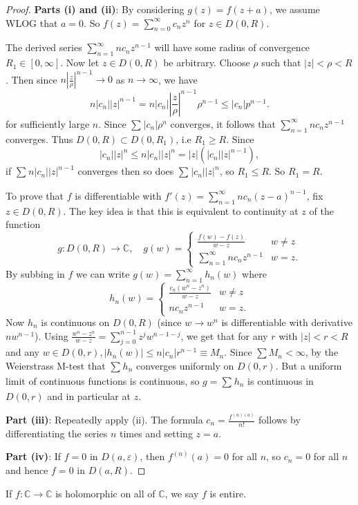 \documentclass[egregdoesnotlikesansseriftitles,a4paper]{scrartcl}
\begin{document}
\begin{proof}
      \textbf{Parts (i) and (ii)}: By considering $g (z)=f (z+a)$, we assume WLOG that $a=0$. So $f (z)=\sum_{n=0}^{ \infty}c_{n}z^{n}$ for $z \in D (0,R)$. 

     The derived series $\sum_{n=1}^{ \infty}nc_{n}z^{n-1}$ will have some radius of convergence $R_1 \in [0, \infty]$. Now let $z \in D (0,R)$ be arbitrary. Choose $\rho$ such that $|z|<\rho<R$. Then since $n |\frac{z}{\rho}|^{n-1} \rightarrow 0 $ as $n \rightarrow \infty$, we have \[
     n |c_n||z|^{n-1}=n |c_n||\frac{z}{\rho}|^{n-1}\rho^{n-1} \leq |c_n|p^{n-1}
     .\]  
     for sufficiently large $n$. Since $\sum_{}^{}|c_{n}|\rho^{n}$ converges, it follows that $\sum_{n=1}^{ \infty}nc_{n}z^{n-1}$ converges. Thus $D (0,R)\subset D (0,R_1 )$, i.e $R_1 \geq R$. Since \[
     |c_{n}||z|^{n} \leq n|c_{n}||z|^{n}=|z|\left(|c_{n}||z|^{n-1}\right)
     ,\] 
     if $\sum_{}^{}n |c_{n}||z|^{n-1}$ converges then so does $\sum_{}^{}|c_{n}||z|^{n}$, so $R_1 \leq R$. So $R_1 =R$. 
     
     To prove that $f$ is differentiable with $f' (z)=\sum_{n=1}^{ \infty}nc_{n}(z-a)^{n-1}$, fix $z \in D (0,R)$. The key idea is that this is equivalent to continuity at $z$ of the function 
     \begin{equation*}
          g: D (0,R) \rightarrow \mathbb{C}, \quad g (w)=
           \begin{cases}
                \frac{f (w)- f (z)}{w-z} & w \neq z\\
                \sum_{n=1}^{ \infty}nc_{n}z^{n-1} & w=z.
           \end{cases}          
     \end{equation*}
     By subbing in $f$ we can write $g (w)=\sum_{n=1}^{ \infty}h_{n}(w)$ where 
     \begin{equation*}
          h_{n} (w)=
          \begin{cases}
               \frac{c_{n}(w^{n}-z^{n})}{w-z} & w \neq z\\
               nc_{n}z^{n-1} & w=z.
          \end{cases}  
     \end{equation*}
     Now $h_{n}$ is continuous on $D (0,R)$ (since $w \rightarrow w^{n}$ is differentiable with derivative $nw^{n-1}$). Using $ \frac{w^{n}-z^{n}}{w-z}=\sum_{j=0}^{n-1}z^{j}w^{n-1-j}$, we get that for any $r$ with $|z|<r<R$ and any $w \in D (0,r), |h_{n}(w)|\leq n |c_{n}|r^{n-1} \equiv M_{n}$. Since $\sum M_{n} < \infty$, by the Weierstrass M-test that $\sum_{}^{}h_{n}$ converges uniformly on $D (0,r)$. But a uniform limit of continuous functions is continuous, so $g = \sum_{}^{}h_{n}$ is continuous in $D (0,r)$ and in particular at $z$.

     \textbf{Part (iii)}: Repeatedly apply (ii). The formula $c_{n}= \frac{f^{(n)(a)}}{n!}$ follows by differentiating the series $n$ times and setting $z=a$. 
     
     \textbf{Part (iv)}: If $f=0$ in $D (a, \varepsilon)$, then $f^{(n)}(a)=0$ for all $n$, so $c_{n}=0$ for all $n$ and hence $f=0$ in $D (a,R)$. 
\end{proof}
If $f: \mathbb{C} \rightarrow \mathbb{C}$ is holomorphic on all of $\mathbb{C}$, we say $f$ is entire. 
\end{document}

